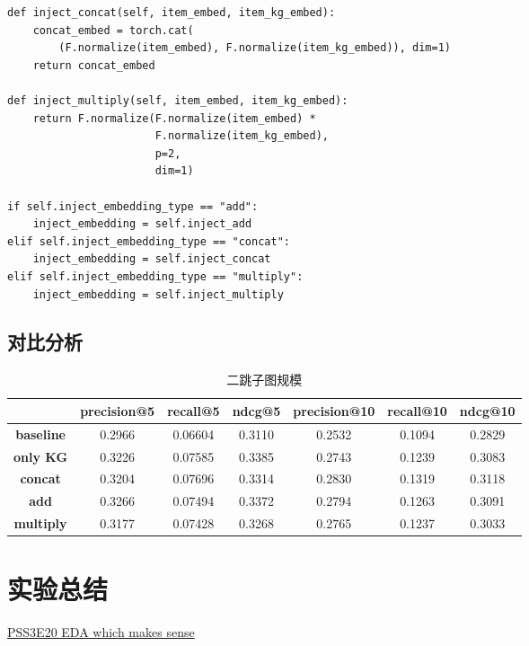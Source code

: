 \documentclass{ctexart}
\begin{document}
\begin{sloppypar}
\begin{enumerate}
\begin{lstlisting}[style=python]
def inject_concat(self, item_embed, item_kg_embed):
    concat_embed = torch.cat(
        (F.normalize(item_embed), F.normalize(item_kg_embed)), dim=1)
    return concat_embed

def inject_multiply(self, item_embed, item_kg_embed):
    return F.normalize(F.normalize(item_embed) *
                       F.normalize(item_kg_embed),
                       p=2,
                       dim=1)

if self.inject_embedding_type == "add":
    inject_embedding = self.inject_add
elif self.inject_embedding_type == "concat":
    inject_embedding = self.inject_concat
elif self.inject_embedding_type == "multiply":
    inject_embedding = self.inject_multiply

    \end{lstlisting}
    \end{enumerate}

    \subsection{对比分析}
    \begin{table}[h]
        \centering
        \caption{二跳子图规模\label{tab:3}}
            \begin{tabular}{ccccccc}
                \toprule
                                  & \textbf{precision@5} & \textbf{recall@5} & \textbf{ndcg@5} & \textbf{precision@10} & \textbf{recall@10} & \textbf{ndcg@10} \\\midrule
                \textbf{baseline} & 0.2966               & 0.06604           & 0.3110          & 0.2532                & 0.1094             & 0.2829           \\
                \textbf{only KG}  & 0.3226               & 0.07585           & 0.3385          & 0.2743                & 0.1239             & 0.3083           \\
                \textbf{concat}   & 0.3204               & 0.07696           & 0.3314          & 0.2830                & 0.1319             & 0.3118           \\
                \textbf{add}      & 0.3266               & 0.07494           & 0.3372          & 0.2794                & 0.1263             & 0.3091           \\
                \textbf{multiply} & 0.3177               & 0.07428           & 0.3268          & 0.2765                & 0.1237             & 0.3033           \\
                \bottomrule
            \end{tabular}
    \end{table}

    \section{实验总结}


    \begin{thebibliography}{100}
        \href{https://www.kaggle.com/code/ambrosm/pss3e20-eda-which-makes-sense}{PSS3E20 EDA which makes sense}
    \end{thebibliography}

\end{sloppypar}
\end{document}
